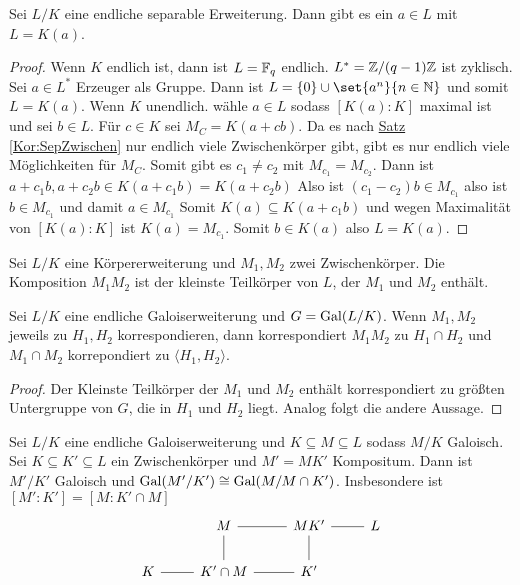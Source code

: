 \begin{Satz}\label{Satz:PrimElt}
Sei $L/K$ eine endliche separable Erweiterung. Dann gibt es ein $a\in L$ mit $L=K(a)$.
    
\end{Satz}
\begin{proof}
    Wenn $K$ endlich ist, dann ist $L=\mathbb{F}_q$ endlich.
    $L^*=\mathbb{Z}/(q-1)\mathbb{Z}$ ist zyklisch. Sei $a\in L^*$ Erzeuger als Gruppe. Dann ist 
    $L=\Set{0}\cup \set{a^n}{ n\in\NN}$ und somit $L=K(a)$. Wenn $K$ unendlich. wähle $a\in L$ sodass $[K(a):K]$ maximal ist und sei $b\in L$. Für $c\in K$ sei $M_C=K(a+cb)$. Da es nach \hyperref[Kor:SepZwischen]{Satz} \ref{Kor:SepZwischen} nur endlich viele Zwischenkörper gibt, gibt es nur endlich viele Möglichkeiten für $M_C$. Somit gibt es $c_1\neq c_2$ mit $M_{c_1}=M_{c_2}$. Dann ist $a+c_1b,a+c_2b\in K(a+c_1b)=K(a+c_2b)$
    Also ist $(c_1-c_2)b\in M_{c_1}$ also ist $b\in M_{c_1}$ und damit $a\in M_{c_1}$
    Somit $K(a)\subseteq K(a+c_1b)$ und wegen Maximalität von $[K(a):K]$ ist $K(a)=M_{c_1}$. Somit $b\in K(a)$ also $L=K(a).$
\end{proof}
\begin{Def}
    Sei $L/K$ eine Körpererweiterung und $M_1,M_2$ zwei Zwischenkörper. Die Komposition $M_1M_2$ ist der kleinste Teilkörper von $L$, der $M_1$ und $M_2$ enthält.
\end{Def}
\begin{Satz}
    Sei $L/K$ eine endliche Galoiserweiterung und $G=\operatorname{Gal}(L/K)$. Wenn $M_1,M_2$ jeweils zu $H_1,H_2$ korrespondieren, dann korrespondiert $M_1M_2$ zu $H_1\cap H_2$ und $M_1\cap M_2$ korrepondiert zu $\langle H_1,H_2\rangle$.
\end{Satz}
\begin{proof}
    Der Kleinste Teilkörper der $M_1$ und $M_2$ enthält korrespondiert zu größten Untergruppe von $G$, die in $H_1$ und $H_2$ liegt. Analog folgt die andere Aussage.
\end{proof}
\begin{Satz}[Translationssatz]\label{Satz:Translat}
    Sei $L/K$ eine endliche Galoiserweiterung und $K\subseteq M\subseteq L$ sodass $M/K$ Galoisch. Sei $K\subseteq K'\subseteq L$ ein Zwischenkörper und $M'=MK'$ Kompositum. Dann ist $M'/K'$ Galoisch und $\operatorname{Gal}(M'/K')\cong \operatorname{Gal}(M/M\cap K')$. Insbesondere ist $[M':K']=[M:K'\cap M]$
    $$%
\begin{tikzcd}
                     & M \arrow[r, no head]                           & MK' \arrow[r, no head] & L \\
K \arrow[r, no head] & K'\cap M \arrow[r, no head] \arrow[u, no head] & K' \arrow[u, no head] &  
\end{tikzcd}$$
\end{Satz}
